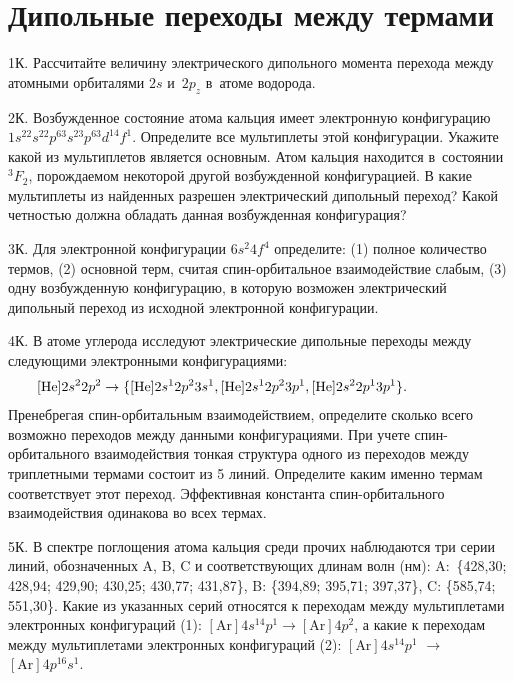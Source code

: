 \setmainfont{Noto Serif}
\setsansfont{Noto Sans}
\setmonofont{Noto Sans Mono}


\section{Дипольные переходы между термами}

1К. Рассчитайте величину электрического дипольного момента перехода между атомными орбиталями $2s$ и~$2p_z$ в~атоме водорода.
\par
2К. Возбужденное состояние атома кальция имеет электронную конфигурацию $1s^22s^22p^63s^23p^63d^14f^1$. Определите все мультиплеты этой конфигурации. Укажите какой из мультиплетов является основным. Атом кальция находится в~состоянии $^3F_2$, порождаемом некоторой другой возбужденной конфигурацией. В какие мультиплеты из найденных разрешен электрический дипольный переход? Какой четностью должна обладать данная возбужденная конфигурация?
\par
3К. Для электронной конфигурации $6s^2 4f^4$ определите: (1) полное количество термов, (2) основной терм, считая спин-орбитальное взаимодействие слабым, (3) одну возбужденную конфигурацию, в которую возможен электрический дипольный переход из исходной электронной конфигурации.
\par
4К. В атоме углерода исследуют электрические дипольные переходы между следующими электронными конфигурациями:
\begin{equation*}
\begin{aligned}
\relax [\text{He}]2s^2 2p^2 \rightarrow \{[\text{He}]2s^1 2p^2 3s^1, [\text{He}]2s^1 2p^2 3p^1, [\text{He}]2s^2 2p^1 3p^1\}.\hspace{19mm}
\end{aligned}
\end{equation*}
Пренебрегая спин-орбитальным взаимодействием, определите сколько всего возможно переходов между данными конфигурациями. При учете спин-орбитального взаимодействия тонкая структура одного из переходов между триплетными термами состоит из 5 линий. Определите каким именно термам соответствует этот переход. Эффективная константа спин-орбитального взаимодействия одинакова во всех термах.
\par
5К. В спектре поглощения атома кальция среди прочих наблюдаются три серии линий, обозначенных A, B, C и соответствующих длинам волн (нм): A:~\{428,30; 428,94; 429,90; 430,25; 430,77; 431,87\}, B: \{394,89; 395,71; 397,37\}, C: \{585,74; 551,30\}. Какие из указанных серий относятся к переходам между мультиплетами электронных конфигураций (1): $[\text{Ar}]4s^14p^1 \rightarrow [\text{Ar}]4p^2$, а какие к переходам между мультиплетами электронных конфигураций (2): $[\text{Ar}]4s^14p^1$ $\rightarrow$ $[\text{Ar}]4p^16s^1$.
\par